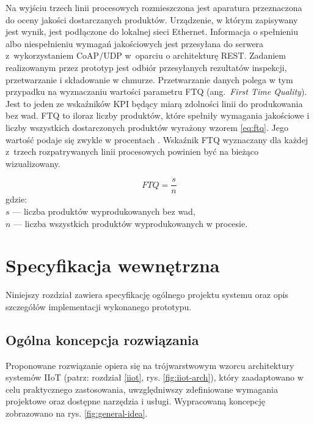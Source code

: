 \documentclass[a4paper, 12pt, twoside]{article}
\begin{document}
Na wyjściu trzech linii procesowych rozmieszczona jest aparatura przeznaczona
do oceny jakości dostarczanych produktów. Urządzenie,
w którym zapisywany jest wynik, jest podłączone do lokalnej sieci Ethernet.
Informacja o spełnieniu albo niespełnieniu wymagań jakościowych jest przesyłana
do serwera z~wykorzystaniem CoAP/UDP w~oparciu o architekturę REST. Zadaniem
realizowanym przez prototyp jest odbiór przesyłanych rezultatów inspekcji,
przetwarzanie i składowanie w chmurze. Przetwarzanie
danych polega w tym przypadku na wyznaczaniu wartości parametru FTQ
(ang.~\emph{First Time Quality}). Jest to jeden ze wskaźników KPI będący miarą
zdolności linii do produkowania bez wad. FTQ to iloraz liczby produktów,
które spełniły wymagania jakościowe i liczby wszystkich dostarczonych produktów
wyrażony wzorem \eqref{eq:ftq}.
Jego wartość podaje się zwykle w procentach \cite{isp}. Wskaźnik FTQ
wyznaczany dla każdej z~trzech rozpatrywanych linii procesowych powinien być na bieżąco wizualizowany.

\begin{equation}
      FTQ = \frac{s}{n}\label{eq:ftq}
\end{equation}
\noindent gdzie: \\
$s$ --- liczba produktów wyprodukowanych bez wad,\\
$n$ --- liczba wszystkich produktów wyprodukowanych w procesie.



\section{Specyfikacja wewnętrzna}\label{spec-wew}

Niniejszy rozdział zawiera specyfikację ogólnego projektu systemu oraz
opis szczegółów implementacji wykonanego prototypu.

\subsection{Ogólna koncepcja rozwiązania}\label{ogolna-koncepcja}

Proponowane rozwiązanie opiera się na trójwarstwowym wzorcu architektury
systemów IIoT (patrz: rozdział \ref{iiot}, rys. \ref{fig:iiot-arch}), który
zaadaptowano w celu praktycznego zastosowania, uwzględniwszy zdefiniowane
wymagania projektowe oraz dostępne narzędzia i usługi. Wypracowaną koncepcję
zobrazowano na rys. \ref{fig:general-idea}.
\end{document}
